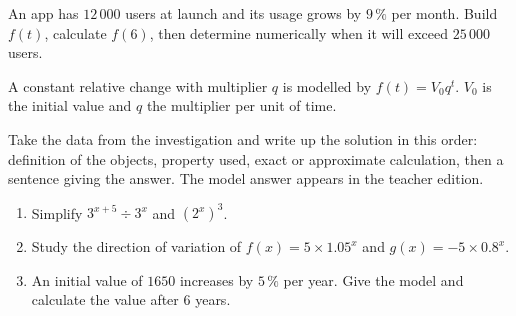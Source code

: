 \begin{activite}
An app has $12\,000$ users at launch and its usage grows by $9\,\%$ per month. Build $f(t)$, calculate $f(6)$, then determine numerically when it will exceed $25\,000$ users.
\begin{center}\end{center}
\end{activite}

\begin{traceecrite}A constant relative change with multiplier $q$ is modelled by $f(t)=V_0q^t$. $V_0$ is the initial value and $q$ the multiplier per unit of time.\end{traceecrite}

\begin{exemple}
Take the data from the investigation and write up the solution in this order: definition of the objects, property used, exact or approximate calculation, then a sentence giving the answer. The model answer appears in the teacher edition.
\end{exemple}

\begin{exercice}[-- essential]
\begin{enumerate}\item Simplify $3^{x+5}\div3^x$ and $(2^x)^3$.\item Study the direction of variation of $f(x)=5\times1.05^x$ and $g(x)=-5\times0.8^x$.\item An initial value of $1650$ increases by $5\,\%$ per year. Give the model and calculate the value after $6$ years.\end{enumerate}
\end{exercice}

